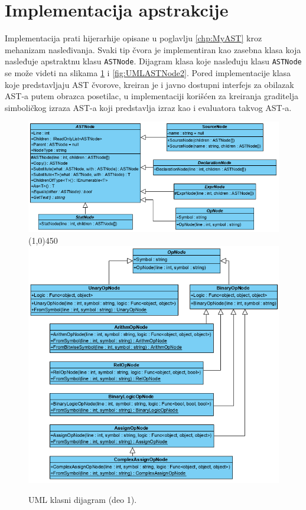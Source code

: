 \section{Implementacija apstrakcije}
\label{sec:ImplementationMyAST}

Implementacija prati hijerarhije opisane u poglavlju \ref{chp:MyAST} kroz mehanizam nasleđivanja. Svaki tip čvora je implementiran kao zasebna klasa koja nasleđuje apstraktnu klasu \texttt{ASTNode}. Dijagram klasa koje nasleđuju klasu \texttt{ASTNode} se može videti na slikama \ref{fig:UMLASTNode1} i \ref{fig:UMLASTNode2}. Pored implementacije klasa koje predstavljaju AST čvorove, kreiran je i javno dostupni interfejs za obilazak AST-a putem obrazca posetilac, u implementaciji korišćen za kreiranja graditelja simboličkog izraza AST-a koji predstavlja izraz kao i evaluatora takvog AST-a.

\begin{figure}[h!]
\centering
\includegraphics[scale=0.7]{images/uml/ASTNode.png}
\line(1,0){450}\\
\includegraphics[scale=0.7]{images/uml/OperatorNode.png}
\caption{UML klasni dijagram (deo 1).}
\label{fig:UMLASTNode1}
\end{figure}

